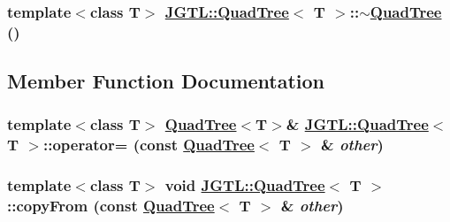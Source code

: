 \hypertarget{class_j_g_t_l_1_1_quad_tree_ea1ebe6c609f4cdd7f78d9d099d7b6a6}{
\subsubsection[$\sim$QuadTree]{\setlength{\rightskip}{0pt plus 5cm}template$<$class T$>$ \hyperlink{class_j_g_t_l_1_1_quad_tree}{JGTL::Quad\-Tree}$<$ T $>$::$\sim$\hyperlink{class_j_g_t_l_1_1_quad_tree}{Quad\-Tree} ()}}
\label{class_j_g_t_l_1_1_quad_tree_ea1ebe6c609f4cdd7f78d9d099d7b6a6}




\subsection{Member Function Documentation}
\hypertarget{class_j_g_t_l_1_1_quad_tree_bdd26472812c1f1c5889a56a3f7f218d}{
\subsubsection[operator=]{\setlength{\rightskip}{0pt plus 5cm}template$<$class T$>$ \hyperlink{class_j_g_t_l_1_1_quad_tree}{Quad\-Tree}$<$T$>$\& \hyperlink{class_j_g_t_l_1_1_quad_tree}{JGTL::Quad\-Tree}$<$ T $>$::operator= (const \hyperlink{class_j_g_t_l_1_1_quad_tree}{Quad\-Tree}$<$ T $>$ \& {\em other})}}
\label{class_j_g_t_l_1_1_quad_tree_bdd26472812c1f1c5889a56a3f7f218d}


\hypertarget{class_j_g_t_l_1_1_quad_tree_faeac9070d0e994db181ce2e7b08bba2}{
\subsubsection[copyFrom]{\setlength{\rightskip}{0pt plus 5cm}template$<$class T$>$ void \hyperlink{class_j_g_t_l_1_1_quad_tree}{JGTL::Quad\-Tree}$<$ T $>$::copy\-From (const \hyperlink{class_j_g_t_l_1_1_quad_tree}{Quad\-Tree}$<$ T $>$ \& {\em other})}}
\label{class_j_g_t_l_1_1_quad_tree_faeac9070d0e994db181ce2e7b08bba2}


